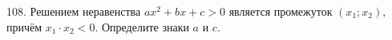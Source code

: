 108. Решением неравенства $ax^2 + bx + c > 0$ является промежуток $(x_1; x_2),$ причём $x_1\cdot x_2 <  0.$ Определите знаки $a$ и $c.$\\
